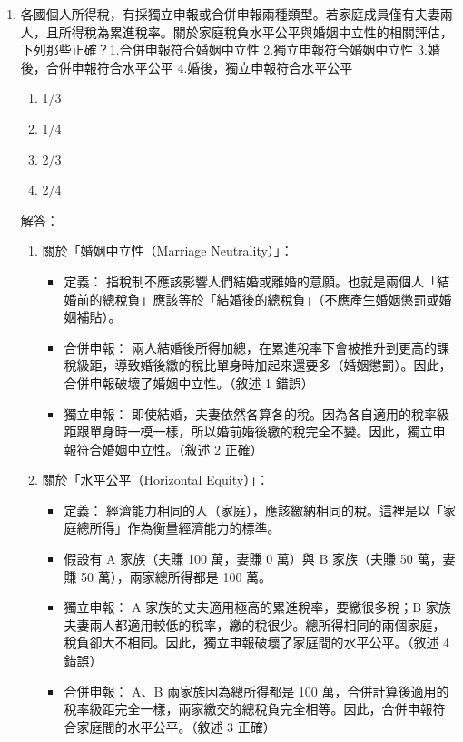 \documentclass[12pt, a4paper]{article}
\begin{document}
\begin{enumerate}
\begin{itemize}
        既然無論課多少稅，癮君子的購買數量幾乎不變（稅基穩固不會流失），政府就可以穩穩地向他們收取大量的菸酒稅。因此，用來充實國庫、增加稅收的效果極佳。
    \end{itemize}

    \item 各國個人所得稅，有採獨立申報或合併申報兩種類型。若家庭成員僅有夫妻兩人，且所得稅為累進稅率。關於家庭稅負水平公平與婚姻中立性的相關評估，下列那些正確？1.合併申報符合婚姻中立性 2.獨立申報符合婚姻中立性 3.婚後，合併申報符合水平公平 4.婚後，獨立申報符合水平公平
    \begin{enumerate}[label=\Alph*.]
        \item 1/3
        \item 1/4
        \item 2/3
        \item 2/4
    \end{enumerate}
    解答：
    \begin{enumerate}[1.]
        \item  關於「婚姻中立性（Marriage Neutrality）」：
        \begin{itemize}
            \item 定義： 指稅制不應該影響人們結婚或離婚的意願。也就是兩個人「結婚前的總稅負」應該等於「結婚後的總稅負」（不應產生婚姻懲罰或婚姻補貼）。
            \item 合併申報： 兩人結婚後所得加總，在累進稅率下會被推升到更高的課稅級距，導致婚後繳的稅比單身時加起來還要多（婚姻懲罰）。因此，合併申報破壞了婚姻中立性。（敘述 1 錯誤）
            \item 獨立申報： 即使結婚，夫妻依然各算各的稅。因為各自適用的稅率級距跟單身時一模一樣，所以婚前婚後繳的稅完全不變。因此，獨立申報符合婚姻中立性。（敘述 2 正確）
        \end{itemize}
        \item 關於「水平公平（Horizontal Equity）」：
        \begin{itemize}
            \item 定義： 經濟能力相同的人（家庭），應該繳納相同的稅。這裡是以「家庭總所得」作為衡量經濟能力的標準。
            \item 假設有 A 家族（夫賺 100 萬，妻賺 0 萬）與 B 家族（夫賺 50 萬，妻賺 50 萬），兩家總所得都是 100 萬。
            \item 獨立申報： A 家族的丈夫適用極高的累進稅率，要繳很多稅；B 家族夫妻兩人都適用較低的稅率，繳的稅很少。總所得相同的兩個家庭，稅負卻大不相同。因此，獨立申報破壞了家庭間的水平公平。（敘述 4 錯誤）
            \item 合併申報： A、B 兩家族因為總所得都是 100 萬，合併計算後適用的稅率級距完全一樣，兩家繳交的總稅負完全相等。因此，合併申報符合家庭間的水平公平。（敘述 3 正確）
        \end{itemize}
    \end{enumerate}


\end{enumerate}
\end{document}
